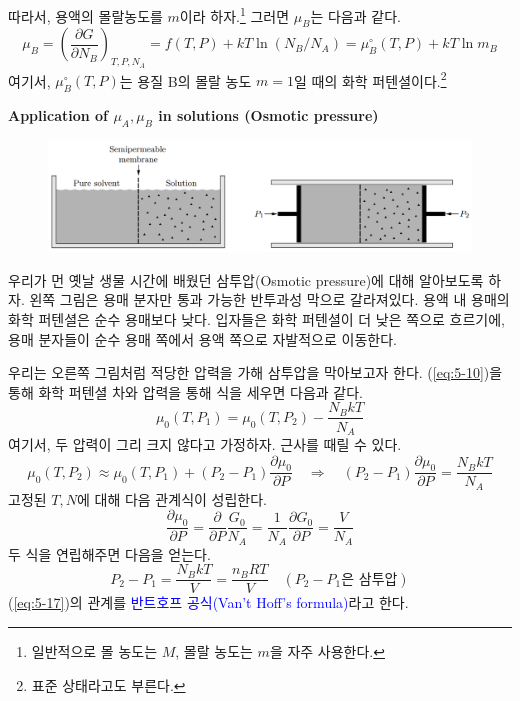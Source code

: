 \documentclass{article}
\begin{document}
따라서, 용액의 몰랄농도를 $m$이라 하자.\footnote{일반적으로 몰 농도는 $M$, 몰랄 농도는 $m$을 자주 사용한다.} 그러면 $\mu_B$는 다음과 같다.
\begin{equation}
    \mu_B = \left( \frac{\partial G}{\partial N_B} \right)_{T,P,N_A} = f(T,P) + kT \ln (N_B / N_A) = \mu_B^\circ (T,P) + kT \ln m_B
\end{equation}
여기서, $\mu_B^\circ (T,P)$는 용질 B의 몰랄 농도 $m=1$일 때의 화학 퍼텐셜이다.\footnote{표준 상태라고도 부른다.}

\vspace{3mm}\noindent
\textbf{Application of $\mu_A, \mu_B$ in solutions (Osmotic pressure)}

\begin{figure}[h]
    \centering
    \includegraphics[width=0.9\linewidth]{images/fig5_2.png}
\end{figure}

우리가 먼 옛날 생물 시간에 배웠던 삼투압(Osmotic pressure)에 대해 알아보도록 하자. 왼쪽 그림은 용매 분자만 통과 가능한 반투과성 막으로 갈라져있다. 용액 내 용매의 화학 퍼텐셜은 순수 용매보다 낮다. 입자들은 화학 퍼텐셜이 더 낮은 쪽으로 흐르기에, 용매 분자들이 순수 용매 쪽에서 용액 쪽으로 자발적으로 이동한다.

우리는 오른쪽 그림처럼 적당한 압력을 가해 삼투압을 막아보고자 한다. (\ref{eq:5-10})을 통해 화학 퍼텐셜 차와 압력을 통해 식을 세우면 다음과 같다.
\begin{equation}
    \mu_0 (T,P_1) = \mu_0 (T,P_2) - \frac{N_B kT}{N_A}
\end{equation}
여기서, 두 압력이 그리 크지 않다고 가정하자. 근사를 때릴 수 있다.
\begin{equation}
    \mu_0 (T, P_2) \approx \mu_0 (T, P_1) + (P_2 - P_1) \frac{\partial \mu_0}{\partial P}
    \quad \Rightarrow \quad (P_2 - P_1) \frac{\partial \mu_0}{\partial P} = \frac{N_B kT}{N_A}
\end{equation}
고정된 $T,N$에 대해 다음 관계식이 성립한다.
\begin{equation}
    \frac{\partial \mu_0}{\partial P} = \frac{\partial }{\partial P} \frac{G_0}{N_A} = \frac{1}{N_A} \frac{\partial G_0}{\partial P} = \frac{V}{N_A}
\end{equation}
두 식을 연립해주면 다음을 얻는다.
\begin{equation}\label{eq:5-17}
    \boxed{P_2 - P_1 = \frac{N_B kT}{V} = \frac{n_B RT}{V}} \quad (\text{$P_2-P_1$은 삼투압})
\end{equation}
(\ref{eq:5-17})의 관계를 \textcolor{blue}{반트호프 공식(Van't Hoff's formula)}라고 한다.
\end{document}
